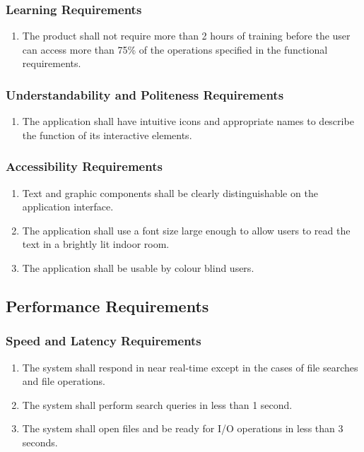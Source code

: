 \documentclass{article}
\begin{document}
\subsubsection{Learning Requirements}
\begin{enumerate}
    \item The product shall not require more than 2 hours of training before the user can access more than 75\% of the operations specified in the functional requirements.
\end{enumerate}

\subsubsection{Understandability and Politeness Requirements}
\begin{enumerate}
    \item The application shall have intuitive icons and appropriate names to describe the function of its interactive elements.
\end{enumerate}

\subsubsection{Accessibility Requirements}
\begin{enumerate}
    \item Text and graphic components shall be clearly distinguishable on the application interface.
    \item The application shall use a font size large enough to allow users to read the text in a brightly lit indoor room.
    \item The application shall be usable by colour blind users.
\end{enumerate}

\subsection{Performance Requirements}
\subsubsection{Speed and Latency Requirements}
\begin{enumerate}
    \item The system shall respond in near real-time except in the cases of file searches and file operations.
    \item The system shall perform search queries in less than 1 second.
    \item The system shall open files and be ready for I/O operations in less than 3 seconds.
\end{enumerate}
\end{document}
